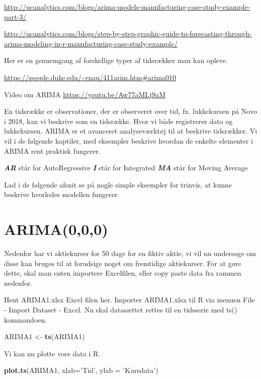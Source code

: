 \documentclass[]{book}
\newenvironment{Shaded}{\begin{snugshade}}{\end{snugshade}}
\newcommand{\DataTypeTok}[1]{\textcolor[rgb]{0.13,0.29,0.53}{#1}}
\newcommand{\KeywordTok}[1]{\textcolor[rgb]{0.13,0.29,0.53}{\textbf{#1}}}
\newcommand{\NormalTok}[1]{#1}
\newcommand{\StringTok}[1]{\textcolor[rgb]{0.31,0.60,0.02}{#1}}
\begin{document}
\url{http://ucanalytics.com/blogs/arima-models-manufacturing-case-study-example-part-3/}

\url{http://ucanalytics.com/blogs/step-by-step-graphic-guide-to-forecasting-through-arima-modeling-in-r-manufacturing-case-study-example/}

Her er en gennemgang af forskellige typer af tidsrækker man kan opleve.

\url{https://people.duke.edu/~rnau/411arim.htm\#arima010}

Video om ARIMA
\url{https://youtu.be/Aw77aMLj9uM}

En tidsrække er observationer, der er observeret over tid, fx. lukkekursen på Novo i 2018, kan vi beskrive som en tidsrække. Hvor vi både registrerer dato og lukkekursen. ARIMA er et avanceret analyseværktøj til at beskrive tidsrækker. Vi vil i de følgende kaptiler, med eksempler beskrive hvordan de enkelte elementer i ARIMA rent praktisk fungerer.

\textbf{\emph{AR}} står for AutoRegressive
\textbf{\emph{I}} står for Integrated
\textbf{\emph{MA}} står for Moving Average

Lad i de følgende afsnit se på nogle simple eksempler for trinvis, at kunne beskrive hvorledes modellen fungerer.

\hypertarget{arima000}{%
\section{ARIMA(0,0,0)}\label{arima000}}

Nedenfor har vi aktiekurser for 50 dage for en fiktiv aktie, vi vil nu undersøge om disse kan bruges til at forudsige noget om fremtidige aktiekurser. For at gøre dette, skal man enten importere Excelfilen, eller copy paste data fra rammen nedenfor.

Hent ARIMA1.xlsx Excel filen her. Importer ARIMA1.xlsx til R via menuen File - Import Dataset - Excel. Nu skal datasættet rettes til en tidsserie med ts() kommandoen.

\begin{Shaded}
\begin{Highlighting}[]
\NormalTok{ARIMA1 <-}\StringTok{ }\KeywordTok{ts}\NormalTok{(ARIMA1)}
\end{Highlighting}
\end{Shaded}

Vi kan nu plotte vore data i R.

\begin{Shaded}
\begin{Highlighting}[]
\KeywordTok{plot.ts}\NormalTok{(ARIMA1, }\DataTypeTok{xlab=}\StringTok{'Tid'}\NormalTok{, }\DataTypeTok{ylab =} \StringTok{'Kursdata'}\NormalTok{)}
\end{Highlighting}
\end{Shaded}
\end{document}
